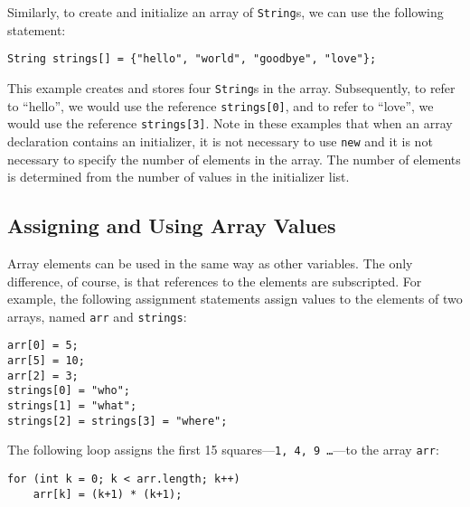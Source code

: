 \noindent Similarly, to create and initialize an array of {\tt String}s,
we can use the following statement:

\begin{jjjlisting}
\begin{lstlisting}
String strings[] = {"hello", "world", "goodbye", "love"};
\end{lstlisting}
\end{jjjlisting}

\noindent This example creates and stores four {\tt String}s
in the array.  Subsequently, to refer to ``hello'', we would use the
reference {\tt strings[0]}, and to refer to ``love'', we would use the
reference {\tt strings[3]}. Note in these examples that when an array
declaration contains an initializer, it is not necessary to use
{\tt new} and it is not necessary to specify the number of elements in the
array.  The number of elements is determined from the number of values
in the initializer list.

\subsection{Assigning and Using Array Values}
\noindent Array elements can be used in the same way as other variables.  The
only difference, of course, is that references to the elements are
subscripted.  For example, the following assignment statements assign values to the elements of two arrays,
named {\tt arr} and {\tt strings}:

\begin{jjjlisting}
\begin{lstlisting}
arr[0] = 5;
arr[5] = 10;
arr[2] = 3;
strings[0] = "who";
strings[1] = "what";
strings[2] = strings[3] = "where";
\end{lstlisting}
\end{jjjlisting}

\noindent The following loop assigns the first 15 squares---{\tt 1, 4,
9 \dots }---to the array {\tt arr}:

\begin{jjjlisting}
\begin{lstlisting}
for (int k = 0; k < arr.length; k++)
    arr[k] = (k+1) * (k+1);
\end{lstlisting}
\end{jjjlisting}

